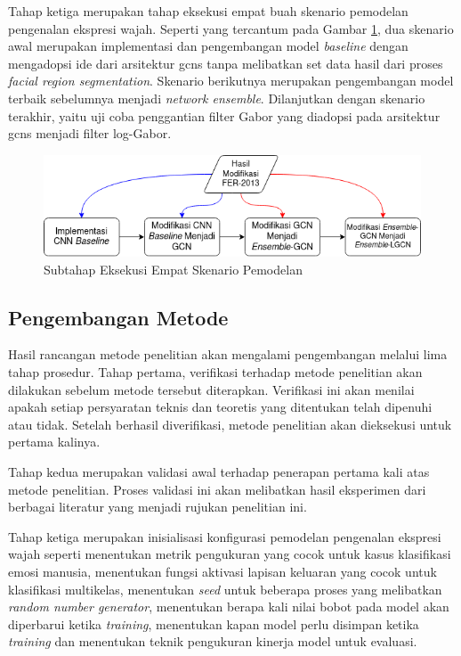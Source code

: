 
Tahap ketiga merupakan tahap eksekusi empat buah skenario pemodelan pengenalan ekspresi wajah. Seperti yang tercantum pada Gambar \ref{fig:skenariotraining}, dua skenario awal merupakan implementasi dan pengembangan model \textit{baseline} dengan mengadopsi ide dari arsitektur \acrshort{gcns} tanpa melibatkan set data hasil dari proses \textit{facial region segmentation}. Skenario berikutnya merupakan pengembangan model terbaik sebelumnya menjadi \textit{network ensemble}. Dilanjutkan dengan skenario terakhir, yaitu uji coba penggantian filter Gabor yang diadopsi pada arsitektur \acrshort{gcns} menjadi filter log-Gabor.
\begin{figure}
    \centering
    \includegraphics[width=14cm]{gambar/skenario_training.png}
    \caption{Subtahap Eksekusi Empat Skenario Pemodelan}
    \label{fig:skenariotraining}
\end{figure}

\subsection{Pengembangan Metode}
Hasil rancangan metode penelitian akan mengalami pengembangan melalui lima tahap prosedur. Tahap pertama, verifikasi terhadap metode penelitian akan dilakukan sebelum metode tersebut diterapkan. Verifikasi ini akan menilai apakah setiap persyaratan teknis dan teoretis yang ditentukan telah dipenuhi atau tidak. Setelah berhasil diverifikasi, metode penelitian akan dieksekusi untuk pertama kalinya.

Tahap kedua merupakan validasi awal terhadap penerapan pertama kali atas metode penelitian. Proses validasi ini akan melibatkan hasil eksperimen dari berbagai literatur yang menjadi rujukan penelitian ini.

Tahap ketiga merupakan inisialisasi konfigurasi pemodelan pengenalan ekspresi wajah seperti menentukan metrik pengukuran yang cocok untuk kasus klasifikasi emosi manusia, menentukan fungsi aktivasi lapisan keluaran yang cocok untuk klasifikasi multikelas, menentukan \textit{seed} untuk beberapa proses yang melibatkan \textit{random number generator}, menentukan berapa kali nilai bobot pada model akan diperbarui ketika \textit{training}, menentukan kapan model perlu disimpan ketika \textit{training} dan menentukan teknik pengukuran kinerja model untuk evaluasi.

